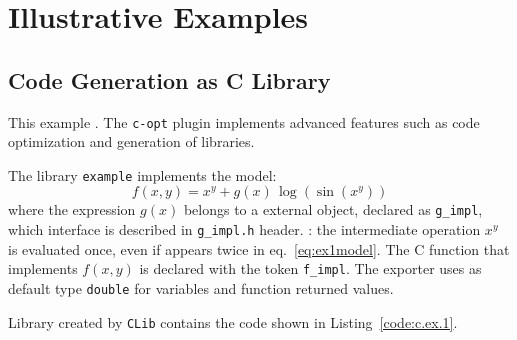
\section{Illustrative Examples}
\label{sec:examples}

\subsection{Code Generation as C Library}
This example . The \texttt{c-opt} plugin implements advanced features such as code optimization and generation of libraries.

The library \texttt{example} implements the model:
\begin{equation}
\label{eq:ex1model}
f(x, y) = x^y + g(x)\, \log(\sin(x^y))
\end{equation}
where the expression $g(x)$ belongs to a external object, declared as \texttt{g\_impl}, which interface is described in \texttt{g\_impl.h} header. : the intermediate operation $x^y$ is evaluated once, even if appears twice in eq.~\ref{eq:ex1model}. The C function that implements $f(x,y)$ is declared with the token \texttt{f\_impl}. The exporter uses as default type \texttt{double} for variables and function returned values.

\noindent%


Library created by \texttt{CLib} contains the code shown in Listing~\ref{code:c.ex.1}.

\noindent%
\begin{minipage}{.5\textwidth}

\end{minipage}\hfill
\begin{minipage}{.5\textwidth}

\end{minipage}

